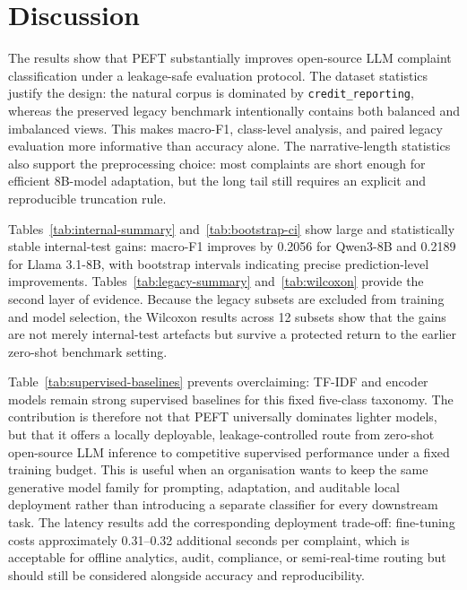 \documentclass{elektr}
\begin{document}
\section{Discussion}

The results show that PEFT substantially improves open-source LLM complaint classification under a leakage-safe evaluation protocol. The dataset statistics justify the design: the natural corpus is dominated by \texttt{credit\_reporting}, whereas the preserved legacy benchmark intentionally contains both balanced and imbalanced views. This makes macro-F1, class-level analysis, and paired legacy evaluation more informative than accuracy alone. The narrative-length statistics also support the preprocessing choice: most complaints are short enough for efficient 8B-model adaptation, but the long tail still requires an explicit and reproducible truncation rule.

Tables~\ref{tab:internal-summary} and~\ref{tab:bootstrap-ci} show large and statistically stable internal-test gains: macro-F1 improves by 0.2056 for Qwen3-8B and 0.2189 for Llama 3.1-8B, with bootstrap intervals indicating precise prediction-level improvements. Tables~\ref{tab:legacy-summary} and~\ref{tab:wilcoxon} provide the second layer of evidence. Because the legacy subsets are excluded from training and model selection, the Wilcoxon results across 12 subsets show that the gains are not merely internal-test artefacts but survive a protected return to the earlier zero-shot benchmark setting.

Table~\ref{tab:supervised-baselines} prevents overclaiming: TF-IDF and encoder models remain strong supervised baselines for this fixed five-class taxonomy. The contribution is therefore not that PEFT universally dominates lighter models, but that it offers a locally deployable, leakage-controlled route from zero-shot open-source LLM inference to competitive supervised performance under a fixed training budget. This is useful when an organisation wants to keep the same generative model family for prompting, adaptation, and auditable local deployment rather than introducing a separate classifier for every downstream task. The latency results add the corresponding deployment trade-off: fine-tuning costs approximately 0.31--0.32 additional seconds per complaint, which is acceptable for offline analytics, audit, compliance, or semi-real-time routing but should still be considered alongside accuracy and reproducibility.
\end{document}
